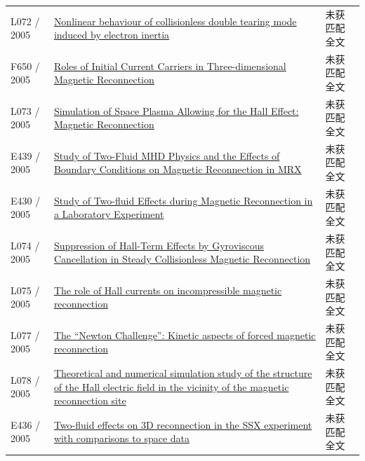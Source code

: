 \begin{longtable}{P{24mm}P{97mm}P{27mm}}
L072 / 2005 & \href{https://doi.org/10.1088/0029-5515/45/11/006}{Nonlinear behaviour of collisionless double tearing mode induced by electron inertia} & 未获匹配全文\\

F650 / 2005 & \href{http://lucid.igpp.ucla.edu/lessons/ess265/2005/7th-ISSS/CONTENTS/DATA_PDF/P-1-29.PDF}{Roles of Initial Current Carriers in Three-dimensional Magnetic Reconnection} & 未获匹配全文\\

L073 / 2005 & \href{https://doi.org/10.1007/s10598-005-0026-5}{Simulation of Space Plasma Allowing for the Hall Effect: Magnetic Reconnection} & 未获匹配全文\\

E439 / 2005 & \href{http://absimage.aps.org/image/DPP05/MWS_DPP05-2005-001148.pdf}{Study of Two-Fluid MHD Physics and the Effects of Boundary Conditions on Magnetic Reconnection in MRX} & 未获匹配全文\\

E430 / 2005 & \href{https://ui.adsabs.harvard.edu/abs/2005APS..DPPLP1096Y/abstract}{Study of Two-fluid Effects during Magnetic Reconnection in a Laboratory Experiment} & 未获匹配全文\\

L074 / 2005 & \href{https://doi.org/10.1103/physrevlett.95.045003}{Suppression of Hall-Term Effects by Gyroviscous Cancellation in Steady Collisionless Magnetic Reconnection} & 未获匹配全文\\

L075 / 2005 & \href{https://doi.org/10.1016/j.asr.2005.06.054}{The role of Hall currents on incompressible magnetic reconnection} & 未获匹配全文\\

L077 / 2005 & \href{https://doi.org/10.1029/2005ja011228}{The “Newton Challenge”: Kinetic aspects of forced magnetic reconnection} & 未获匹配全文\\

L078 / 2005 & \href{https://doi.org/10.1017/s0022377805003922}{Theoretical and numerical simulation study of the structure of the Hall electric field in the vicinity of the magnetic reconnection site} & 未获匹配全文\\

E436 / 2005 & \href{http://absimage.aps.org/image/DPP05/MWS_DPP05-2005-000619.pdf}{Two-fluid effects on 3D reconnection in the SSX experiment with comparisons to space data} & 未获匹配全文\\


\end{longtable}
